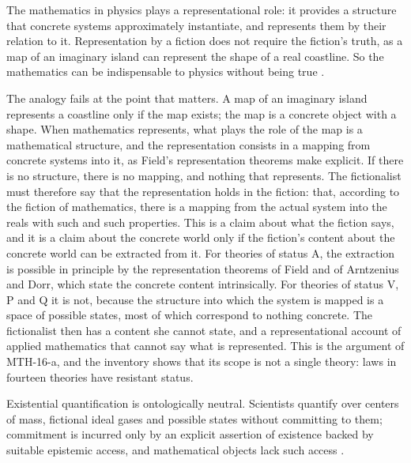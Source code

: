 \documentclass{situationist-preprint}
\begin{document}
\begin{objection}\label{o:leng}
The mathematics in physics plays a representational role: it provides a structure that concrete systems approximately instantiate, and represents them by their relation to it. Representation by a fiction does not require the fiction's truth, as a map of an imaginary island can represent the shape of a real coastline. So the mathematics can be indispensable to physics without being true \citep{Leng2010,Yablo2005}.
\end{objection}

\begin{reply}
The analogy fails at the point that matters. A map of an imaginary island represents a coastline only if the map exists; the map is a concrete object with a shape. When mathematics represents, what plays the role of the map is a mathematical structure, and the representation consists in a mapping from concrete systems into it, as Field's representation theorems make explicit. If there is no structure, there is no mapping, and nothing that represents. The fictionalist must therefore say that the representation holds in the fiction: that, according to the fiction of mathematics, there is a mapping from the actual system into the reals with such and such properties. This is a claim about what the fiction says, and it is a claim about the concrete world only if the fiction's content about the concrete world can be extracted from it. For theories of status A, the extraction is possible in principle by the representation theorems of Field and of Arntzenius and Dorr, which state the concrete content intrinsically. For theories of status V, P and Q it is not, because the structure into which the system is mapped is a space of possible states, most of which correspond to nothing concrete. The fictionalist then has a content she cannot state, and a representational account of applied mathematics that cannot say what is represented. This is the argument of MTH-16-a, and the inventory shows that its scope is not a single theory: \nResistant{} laws in fourteen theories have resistant status.
\end{reply}

\begin{objection}\label{o:azz}
Existential quantification is ontologically neutral. Scientists quantify over centers of mass, fictional ideal gases and possible states without committing to them; commitment is incurred only by an explicit assertion of existence backed by suitable epistemic access, and mathematical objects lack such access \citep{Azzouni2004}.
\end{objection}
\end{document}
